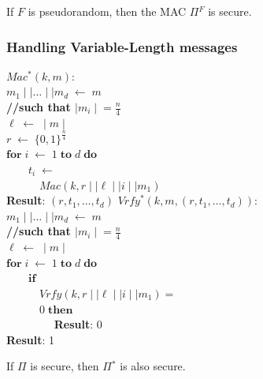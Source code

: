 \documentclass[../main]{subfiles}
\begin{document}
\begin{theorem}
    If $F$ is pseudorandom, then the MAC $\Pi{}^F$ is secure.
\end{theorem}
\subsubsection{Handling Variable-Length messages}
$Mac^{*}(k, m)$:\\
$m_1 \mid\mid{} \ldots{} \mid\mid{} m_d \; \leftarrow{} \; m$\\
\textbf{//such that $\mid{} m_i \mid{} = \frac{n}{4}$}\\
$\ell{} \; \leftarrow{} \; \mid{} m \mid{}$\\
$r \; \leftarrow{} \; \{0, 1\}^{\frac{n}{4}}$\\
$\textbf{for} \; i \; \leftarrow{} \; 1 \; \textbf{to} \; d \; \textbf{do}$\\
$\quad{}\quad{} t_i \; \leftarrow{} \;$\\
$\quad{}\quad{}\quad{} Mac(k, r\mid\mid{}\ell\mid\mid{}i\mid\mid{}m_1)$\\
\textbf{Result}: $(r, t_1, \ldots{},t_d)$
\newline
\newline
$Vrfy^{*}(k, m, (r, t_1, \ldots{}, t_d))$:\\
$m_1 \mid\mid{} \ldots{} \mid\mid{} m_d \; \leftarrow{} \; m$\\
\textbf{//such that $\mid{} m_i \mid{} = \frac{n}{4}$}\\
$\ell{} \; \leftarrow{} \; \mid{} m \mid{}$\\
$\textbf{for} \; i \; \leftarrow{} \; 1 \; \textbf{to} \; d \; \textbf{do}$\\
$\quad{}\quad{} \textbf{if}$\\
$\quad{}\quad{}\quad{} Vrfy(k, r\mid\mid{}\ell\mid\mid{}i\mid\mid{}m_1) = $\\
$\quad{}\quad{}\quad{} 0 \; \textbf{then}$\\
$\quad{}\quad{}\quad{}\quad{}$ \textbf{Result}: 0\\
\textbf{Result}: 1

\begin{theorem}
    If $\Pi{}$ is secure, then $\Pi{}^*$ is also secure.
\end{theorem}
\end{document}
